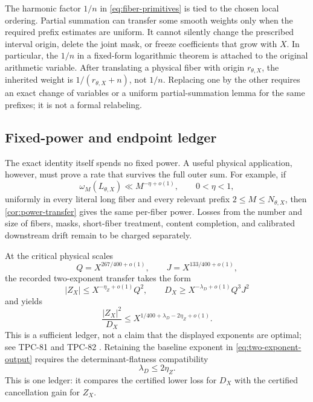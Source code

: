 \begin{remark}
\label{rem:weights-origins}
The harmonic factor \(1/n\) in \eqref{eq:fiber-primitives} is tied to
the chosen local ordering.  Partial summation can transfer some
smooth weights only when the required prefix estimates are uniform.
It cannot silently change the prescribed interval origin, delete the
joint mask, or freeze coefficients that grow with \(X\).
In particular, the \(1/n\) in a fixed-form logarithmic theorem is
attached to the original arithmetic variable.  After translating a
physical fiber with origin \(r_{\theta,X}\), the inherited weight is
\(1/(r_{\theta,X}+n)\), not \(1/n\).  Replacing one by the other
requires an exact change of variables or a uniform partial-summation
lemma for the same prefixes; it is not a formal relabeling.
\end{remark}

\subsection{Fixed-power and endpoint ledger}

The exact identity itself spends no fixed power.  A useful physical
application, however, must prove a rate that survives the full outer
sum.  For example, if
\[
 \omega_M(L_{\theta,X})
 \ll M^{-\eta+o(1)},\qquad 0<\eta<1,
\]
uniformly in every literal long fiber and every relevant prefix
\(2\le M\le N_{\theta,X}\), then
\cref{cor:power-transfer} gives the same per-fiber power.  Losses
from the number and size of fibers, masks, short-fiber treatment,
content completion, and calibrated downstream drift remain to be
charged separately.

At the critical physical scales
\[
 Q=X^{267/400+o(1)},\qquad J=X^{133/400+o(1)},
\]
the recorded two-exponent transfer takes the form
\begin{equation}
 |Z_X|\le X^{-\eta_Z+o(1)}Q^2,\qquad
 D_X\ge X^{-\lambda_D+o(1)}Q^3J^2
\label{eq:two-exponent-input}
\end{equation}
and yields
\begin{equation}
 \frac{|Z_X|^2}{D_X}
 \le X^{1/400+\lambda_D-2\eta_Z+o(1)}.
\label{eq:two-exponent-output}
\end{equation}
This is a sufficient ledger, not a claim that the displayed
exponents are optimal; see TPC-81 and TPC-82
\citep{WangTPC81,WangTPC82}.
Retaining the baseline exponent in
\eqref{eq:two-exponent-output} requires the determinant-flatness
compatibility
\begin{equation}
 \lambda_D\le 2\eta_Z.
\label{eq:determinant-flatness-ledger}
\end{equation}
This is one ledger: it compares the certified lower loss for \(D_X\)
with the certified cancellation gain for \(Z_X\).

